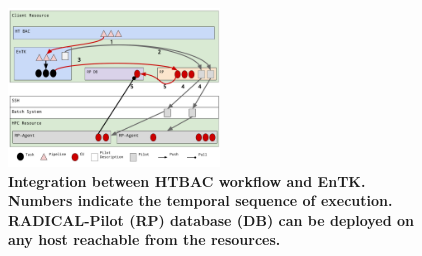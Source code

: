 \begin{figure}
\centering
  \includegraphics[width=0.5\textwidth]{FIGURES/ht-bac-rp_integration.pdf}
  \caption{\bf Integration between HTBAC workflow and EnTK\@. Numbers
  indicate the temporal sequence of execution. RADICAL-Pilot (RP) database
  (DB) can be deployed on any host reachable from the
  resources.}\label{figure:ht-bac_rp}
\end{figure}



